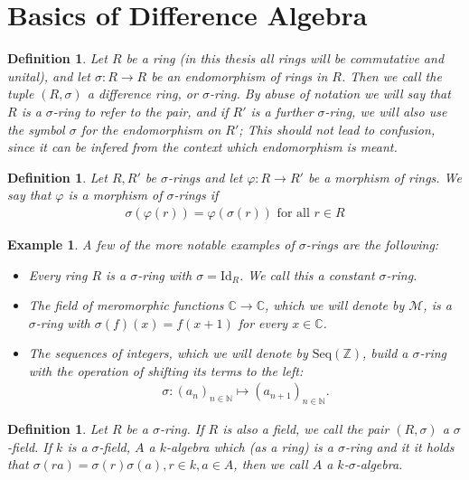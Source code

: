 \documentclass{article}
\def\N{\mathbb{N}}
\def\Z{\mathbb{Z}}
\def\C{\mathbb{C}}
\def\s{\sigma}
\def\fa{\text{ for all }}
\def\Id{\text{Id}}
\theoremstyle{plain}
\newtheorem{ex}[Satz]{Example}
\newtheorem{defn}[Satz]{Definition}
\theoremstyle{definition}
\begin{document}
\section{Basics of Difference Algebra}\label{fundamentos}
\begin{defn}
Let  $R$ be a ring (in this thesis all rings will be commutative and unital), and let
 $\sigma: R \rightarrow R$ be an endomorphism of rings in $R$. Then we call the tuple $(R,\sigma)$ a \emph{difference ring}, or $\sigma$\emph{-ring}. \index{$\s$-ring}
By abuse of notation we will say that $R$ is a $\sigma$-ring  to refer to the pair, and if $R'$ is a further $\sigma$-ring, we will also use the symbol $\sigma$ for the endomorphism on $R'$; This should not lead to confusion, since it can be infered from the context which endomorphism is meant. 
\end{defn}

\begin{defn}
Let $R, R'$ be  $\sigma$-rings and let $\varphi: R \rightarrow R'$ be a morphism of rings. We say that $\varphi$ is a \emph{morphism of $\sigma$-rings}  if 
\begin{align*}
\sigma(\varphi(r)) = \varphi(\sigma(r)) \fa r \in R
\end{align*}
\end{defn}

\begin{ex} A few of the more notable examples of $\s$-rings are the following:

\begin{itemize}
\item Every ring $R$ is a $\sigma$-ring with $\sigma = \Id_R$. We call this a \emph{constant $\s$-ring}.  \index{constant $\s$-ring}
\item The field of meromorphic functions $\C \rightarrow \C$, which we will denote by $\mathcal{M}$,
is a $\sigma$-ring with $\sigma(f)(x) = f(x+1)$ for every $x \in \C$.
\item The sequences of integers, which we will denote by $\text{Seq}(\Z)$, build a $\sigma$-ring with the operation of shifting its terms to the left:
\begin{align*} \sigma: (a_n)_{n \in \N} \mapsto (a_{n+1})_{n \in \N}. \end{align*}
\end{itemize}
\end{ex}

\begin{defn}
Let $R$ be a $\sigma$-ring. If $R$ is also a field, we call the pair $(R,\sigma)$ a $\sigma$\emph{-field}. \index{$\s$-field} 
If $k$ is a $\sigma$-field, $A$ a $k$-algebra which (as a ring) is a $\sigma$-ring and it it holds that 
$\sigma(ra) = \sigma(r) \sigma(a), r \in k, a \in A$, then we call $A$ a  $k$-$\sigma$\emph{-algebra}. 
\end{defn}
\end{document}
